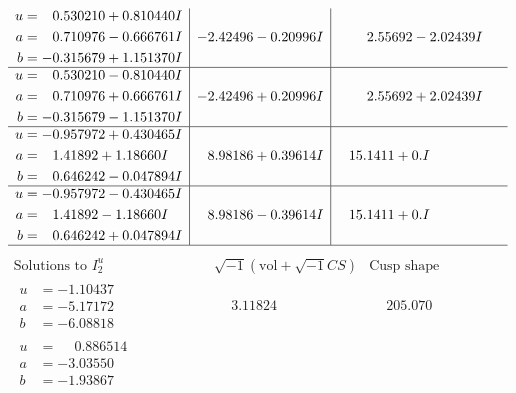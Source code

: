 \documentclass[1p]{elsarticle_modified}
\theoremstyle{definition}
\newcommand{\I}{\sqrt{-1}}
\begin{document}
$$\begin{array}{c|c|c}
\begin{aligned}
u &= \phantom{-}0.530210 + 0.810440 I \\
a &= \phantom{-}0.710976 - 0.666761 I \\
b &= -0.315679 + 1.151370 I\end{aligned}
 & -2.42496 - 0.20996 I & \phantom{-}2.55692 - 2.02439 I \\ \hline\begin{aligned}
u &= \phantom{-}0.530210 - 0.810440 I \\
a &= \phantom{-}0.710976 + 0.666761 I \\
b &= -0.315679 - 1.151370 I\end{aligned}
 & -2.42496 + 0.20996 I & \phantom{-}2.55692 + 2.02439 I \\ \hline\begin{aligned}
u &= -0.957972 + 0.430465 I \\
a &= \phantom{-}1.41892 + 1.18660 I \\
b &= \phantom{-}0.646242 - 0.047894 I\end{aligned}
 & \phantom{-}8.98186 + 0.39614 I & \phantom{-}15.1411 + 0. I\phantom{ +0.000000I} \\ \hline\begin{aligned}
u &= -0.957972 - 0.430465 I \\
a &= \phantom{-}1.41892 - 1.18660 I \\
b &= \phantom{-}0.646242 + 0.047894 I\end{aligned}
 & \phantom{-}8.98186 - 0.39614 I & \phantom{-}15.1411 + 0. I\phantom{ +0.000000I}\\
 \hline 
 \end{array}$$\newpage$$\begin{array}{c|c|c}  
\text{Solutions to }I^u_{2}& \I (\text{vol} + \sqrt{-1}CS) & \text{Cusp shape}\\
 \hline 
\begin{aligned}
u &= -1.10437\phantom{ +0.000000I} \\
a &= -5.17172\phantom{ +0.000000I} \\
b &= -6.08818\phantom{ +0.000000I}\end{aligned}
 & \phantom{-}3.11824\phantom{ +0.000000I} & \phantom{-}205.070\phantom{ +0.000000I} \\ \hline\begin{aligned}
u &= \phantom{-}0.886514\phantom{ +0.000000I} \\
a &= -3.03550\phantom{ +0.000000I} \\
b &= -1.93867\phantom{ +0.000000I}\end{aligned}

\end{array}$$
\end{document}
